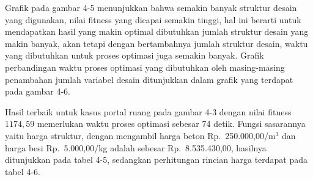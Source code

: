 Grafik pada gambar 4-5 menunjukkan bahwa semakin banyak struktur desain
yang digunakan, nilai fitness yang dicapai semakin tinggi, hal ini
berarti untuk mendapatkan hasil yang makin optimal dibutuhkan jumlah
struktur desain yang makin banyak, akan tetapi dengan bertambahnya jumlah
struktur desain, waktu yang dibutuhkan untuk proses optimasi juga
semakin banyak. Grafik perbandingan waktu proses optimasi yang
dibutuhkan oleh masing-masing penambahan jumlah variabel desain
ditunjukkan dalam grafik yang terdapat pada gambar 4-6.


Hasil terbaik untuk kasus portal ruang pada gambar 4-3 dengan nilai
fitness $1174{,}59$ memerlukan waktu proses optimasi sebesar 74 detik.
Fungsi sasarannya yaitu harga struktur, dengan mengambil harga beton
Rp.\ 250.000,00/m$^3$ dan harga besi Rp.\ 5.000,00/kg adalah sebesar
Rp.\ 8.535.430,00, hasilnya ditunjukkan pada tabel 4-5, sedangkan
perhitungan rincian harga terdapat pada tabel 4-6.

